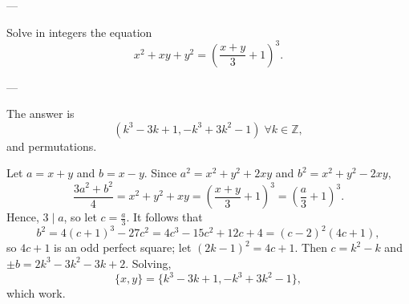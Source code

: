 
---

Solve in integers the equation \[x^2+xy+y^2=\left(\frac{x+y}3+1\right)^3.\]

---

The answer is \[\boxed{(k^3-3k+1,-k^3+3k^2-1)}\;\forall k\in\mathbb Z,\]
and permutations.

Let $a=x+y$ and $b=x-y$. Since $a^2=x^2+y^2+2xy$ and $b^2=x^2+y^2-2xy$, \[\frac{3a^2+b^2}4=x^2+y^2+xy=\left(\frac{x+y}3+1\right)^3=\left(\frac a3+1\right)^3.\]
Hence, $3\mid a$, so let $c=\tfrac a3$. It follows that \[b^2=4(c+1)^3-27c^2=4c^3-15c^2+12c+4=(c-2)^2(4c+1),\]
so $4c+1$ is an odd perfect square; let $(2k-1)^2=4c+1$. Then $c=k^2-k$ and $\pm b=2k^3-3k^2-3k+2$. Solving, \[\{x,y\}=\{k^3-3k+1,-k^3+3k^2-1\},\]
which work.
